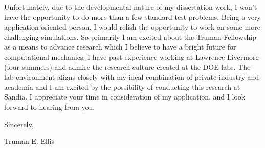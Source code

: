 \documentclass[12pt,letterpaper]{article}
\begin{document}
Unfortunately, due to the developmental nature of my dissertation work, I won't have the opportunity to do more than a few standard test problems.
Being a very application-oriented person, I would relish the opportunity to work on some more challenging simulations.
So primarily I am excited about the Truman Fellowship as a means to advance research which I believe to have a bright future for computational mechanics.
I have past experience working at Lawrence Livermore (four summers) and admire the research culture created at the DOE labs. 
The lab environment aligns closely with my ideal combination of private industry and academia 
and I am excited by the possibility of conducting this research at Sandia.
I appreciate your time in consideration of my application, and I look forward to hearing from you.

\medskip
Sincerely,

\medskip
Truman E. Ellis
\end{document}
